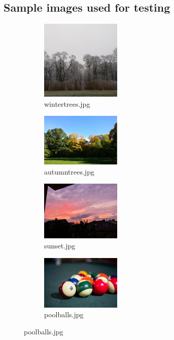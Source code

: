 \documentclass[12pt]{article}
\begin{document}
\subsection{Sample images used for testing}\label{appendixSampleImages}
\begin{figure}[H]
	\begin{subfigure}[b]{0.26\textwidth}
		\includegraphics[width = 1.5in]{wintertrees.jpg}
		\caption{wintertrees.jpg}
	\end{subfigure}%
	\begin{subfigure}[b]{0.26\textwidth}
		\includegraphics[width = 1.5in]{autumntrees.jpg}
		\caption{autumntrees.jpg}
	\end{subfigure}%
	\begin{subfigure}[b]{0.26\textwidth}
		\includegraphics[width = 1.5in]{sunset.jpg}
		\caption{sunset.jpg}
	\end{subfigure}%
	\begin{subfigure}[b]{0.26\textwidth}
		\includegraphics[width = 1.5in]{poolballs.jpg}
		\caption{poolballs.jpg}
	\end{subfigure}
	

\end{figure}
\end{document}
